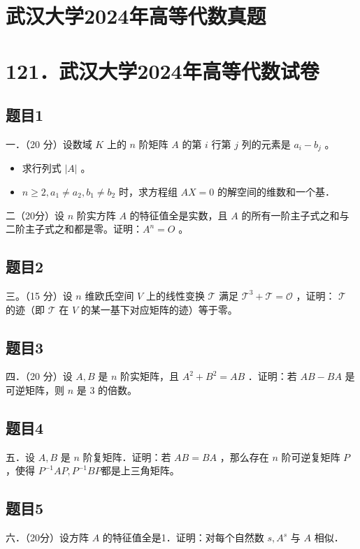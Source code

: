 \documentclass{article}
\begin{document}
\section*{武汉大学2024年高等代数真题}
\section*{121．武汉大学2024年高等代数试卷}

\subsection{题目1}
一．（20 分）设数域 \(K\) 上的 \(n\) 阶矩阵 \(A\) 的第 \(i\) 行第 \(j\) 列的元素是 \(a_{i}-b_{j}\) 。

\begin{itemize}
  \item[（1）] 求行列式 \(|A|\) 。
  \item[（2）] \(n \geq 2, a_{1} \neq a_{2}, b_{1} \neq b_{2}\) 时，求方程组 \(A X=0\) 的解空间的维数和一个基．
\end{itemize}

二（20分）设 \(n\) 阶实方阵 \(A\) 的特征值全是实数，且 \(A\) 的所有一阶主子式之和与二阶主子式之和都是零。证明：\(A^{n}=O\) 。

\subsection{题目2}
三。（15 分）设 \(n\) 维欧氏空间 \(V\) 上的线性变换 \(\mathcal{T}\) 满足 \(\mathcal{T}^{3}+\mathcal{T}=\mathcal{O}\) ，证明： \(\mathcal{T}\) 的迹（即 \(\mathcal{T}\) 在 \(V\) 的某一基下对应矩阵的迹）等于零。

\subsection{题目3}
四．（20 分）设 \(A, B\) 是 \(n\) 阶实矩阵，且 \(A^{2}+B^{2}=A B\) ．证明：若 \(A B-B A\) 是可逆矩阵，则 \(n\) 是 3 的倍数。

\subsection{题目4}
五．设 \(A, B\) 是 \(n\) 阶复矩阵．证明：若 \(A B=B A\) ，那么存在 \(n\) 阶可逆复矩阵 \(P\) ，使得 \(P^{-1} A P, P^{-1} B P\)都是上三角矩阵。

\subsection{题目5}
六．（20分）设方阵 \(A\) 的特征值全是1．证明：对每个自然数 \(s, A^{s}\) 与 \(A\) 相似．
\end{document}

